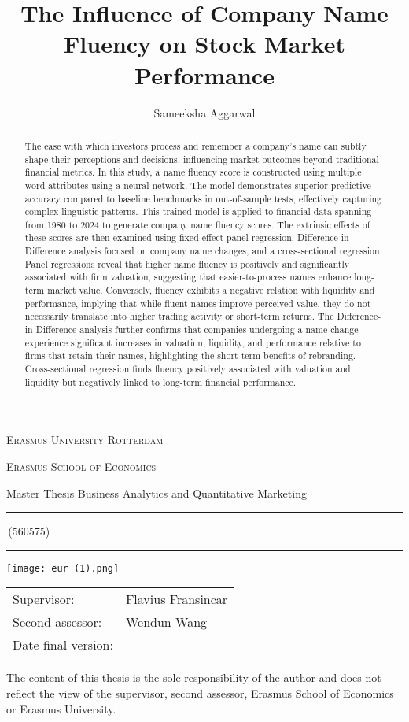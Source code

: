 \documentclass[a4paper,11pt]{report}
\author{Sameeksha Aggarwal}
\title{The Influence of Company Name Fluency on Stock Market Performance}
\newcommand{\studentnumber}{560575}
\newcommand{\program}{Business Analytics and Quantitative Marketing}
\newcommand{\supervisor}{Flavius Fransincar}
\newcommand{\secondassesor}{Wendun Wang}
\begin{document}
\begin{titlepage}
\makeatletter
\begin{center}
	\textsc{Erasmus University Rotterdam}
	\par \textsc{Erasmus School of Economics}
	\par Master Thesis \program

	\vfill \hrule height .08em \bigskip
	\par\huge\@title\bigskip
	\par\Large\@author\,(\studentnumber)\bigskip
	\hrule height .08em\normalsize
	
	\vfill
	\texttt{[image: eur (1).png]} 
	\vfill
	
	\begin{tabular}{ll}
		\toprule
		Supervisor: & \supervisor\\
		Second assessor: & \secondassesor\\
		Date final version: & \@date\\
		\bottomrule
	\end{tabular}
	
	\vfill
	The content of this thesis is the sole responsibility of the author and does not reflect the view of the supervisor, second assessor, Erasmus School of Economics or Erasmus University.
\end{center}
\makeatother
\end{titlepage}

\begin{abstract}
The ease with which investors process and remember a company’s name can subtly shape their perceptions and decisions, influencing market outcomes beyond traditional financial metrics. In this study, a name fluency score is constructed using multiple word attributes using a neural network. The model demonstrates superior predictive accuracy compared to baseline benchmarks in out-of-sample tests, effectively capturing complex linguistic patterns. This trained model is applied to financial data spanning from 1980 to 2024 to generate company name fluency scores. The extrinsic effects of these scores are then examined using fixed-effect panel regression, Difference-in-Difference analysis focused on company name changes, and a cross-sectional regression. Panel regressions reveal that higher name fluency is positively and significantly associated with firm valuation, suggesting that easier-to-process names enhance long-term market value. Conversely, fluency exhibits a negative relation with liquidity and performance, implying that while fluent names improve perceived value, they do not necessarily translate into higher trading activity or short-term returns. The Difference-in-Difference analysis further confirms that companies undergoing a name change experience significant increases in valuation, liquidity, and performance relative to firms that retain their names, highlighting the short-term benefits of rebranding. Cross-sectional regression finds fluency positively associated with valuation and liquidity but negatively linked to long-term financial performance. 

\end{abstract}
\end{document}

